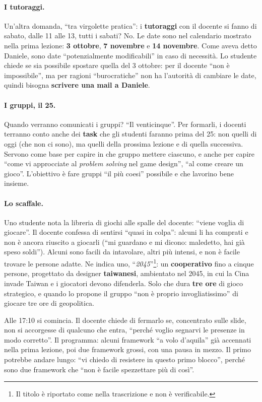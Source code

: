 \paragraph{I tutoraggi.} Un'altra domanda, ``tra virgolette pratica'': i
\textbf{tutoraggi} con il docente si fanno di sabato, dalle 11 alle 13, tutti i
sabati? No. Le date sono nel calendario mostrato nella prima lezione: \textbf{3
ottobre}, \textbf{7 novembre} e \textbf{14 novembre}. Come aveva detto Daniele,
sono date ``potenzialmente modificabili'' in caso di necessità. Lo studente
chiede se sia possibile spostare quella del 3 ottobre: per il docente ``non è
impossibile'', ma per ragioni ``burocratiche'' non ha l'autorità di cambiare le
date, quindi bisogna \textbf{scrivere una mail a Daniele}.

\paragraph{I gruppi, il 25.} Quando verranno comunicati i gruppi? ``Il
venticinque''. Per formarli, i docenti terranno conto anche dei \textbf{task} che
gli studenti faranno prima del 25: non quelli di oggi (che non ci sono), ma
quelli della prossima lezione e di quella successiva. Servono come base per
capire in che gruppo mettere ciascuno, e anche per capire ``come vi approcciate
al \emph{problem solving} nel game design'', ``al come creare un gioco''.
L'obiettivo è fare gruppi ``il più coesi'' possibile e che lavorino bene insieme.

\paragraph{Lo scaffale.} Uno studente nota la libreria di giochi alle spalle del
docente: ``viene voglia di giocare''. Il docente confessa di sentirsi ``quasi in
colpa'': alcuni li ha comprati e non è ancora riuscito a giocarli (``mi guardano
e mi dicono: maledetto, hai già speso soldi''). Alcuni sono facili da
intavolare, altri più intensi, e non è facile trovare le persone adatte. Ne
indica uno, ``\emph{2045}''\footnote{Il titolo è riportato come nella
trascrizione e non è verificabile.}: un \textbf{cooperativo} fino a cinque
persone, progettato da designer \textbf{taiwanesi}, ambientato nel 2045, in cui
la Cina invade Taiwan e i giocatori devono difenderla. Solo che dura
\textbf{tre ore} di gioco strategico, e quando lo propone il gruppo ``non è
proprio invogliatissimo'' di giocare tre ore di geopolitica.

Alle 17:10 si comincia. Il docente chiede di fermarlo se, concentrato sulle
slide, non si accorgesse di qualcuno che entra, ``perché voglio segnarvi le
presenze in modo corretto''. Il programma: alcuni framework ``a volo d'aquila''
già accennati nella prima lezione, poi due framework grossi, con una pausa in
mezzo. Il primo potrebbe andare lungo: ``vi chiedo di resistere in questo primo
blocco'', perché sono due framework che ``non è facile spezzettare più di
così''.

